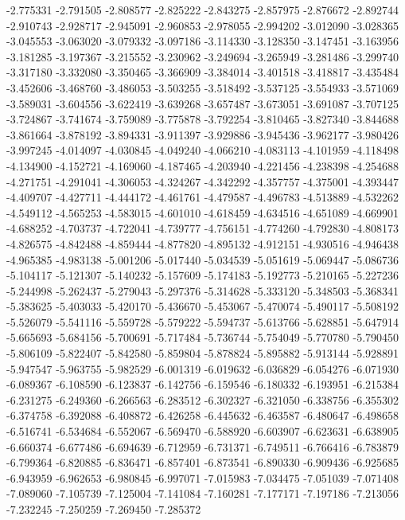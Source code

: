 -2.775331
-2.791505
-2.808577
-2.825222
-2.843275
-2.857975
-2.876672
-2.892744
-2.910743
-2.928717
-2.945091
-2.960853
-2.978055
-2.994202
-3.012090
-3.028365
-3.045553
-3.063020
-3.079332
-3.097186
-3.114330
-3.128350
-3.147451
-3.163956
-3.181285
-3.197367
-3.215552
-3.230962
-3.249694
-3.265949
-3.281486
-3.299740
-3.317180
-3.332080
-3.350465
-3.366909
-3.384014
-3.401518
-3.418817
-3.435484
-3.452606
-3.468760
-3.486053
-3.503255
-3.518492
-3.537125
-3.554933
-3.571069
-3.589031
-3.604556
-3.622419
-3.639268
-3.657487
-3.673051
-3.691087
-3.707125
-3.724867
-3.741674
-3.759089
-3.775878
-3.792254
-3.810465
-3.827340
-3.844688
-3.861664
-3.878192
-3.894331
-3.911397
-3.929886
-3.945436
-3.962177
-3.980426
-3.997245
-4.014097
-4.030845
-4.049240
-4.066210
-4.083113
-4.101959
-4.118498
-4.134900
-4.152721
-4.169060
-4.187465
-4.203940
-4.221456
-4.238398
-4.254688
-4.271751
-4.291041
-4.306053
-4.324267
-4.342292
-4.357757
-4.375001
-4.393447
-4.409707
-4.427711
-4.444172
-4.461761
-4.479587
-4.496783
-4.513889
-4.532262
-4.549112
-4.565253
-4.583015
-4.601010
-4.618459
-4.634516
-4.651089
-4.669901
-4.688252
-4.703737
-4.722041
-4.739777
-4.756151
-4.774260
-4.792830
-4.808173
-4.826575
-4.842488
-4.859444
-4.877820
-4.895132
-4.912151
-4.930516
-4.946438
-4.965385
-4.983138
-5.001206
-5.017440
-5.034539
-5.051619
-5.069447
-5.086736
-5.104117
-5.121307
-5.140232
-5.157609
-5.174183
-5.192773
-5.210165
-5.227236
-5.244998
-5.262437
-5.279043
-5.297376
-5.314628
-5.333120
-5.348503
-5.368341
-5.383625
-5.403033
-5.420170
-5.436670
-5.453067
-5.470074
-5.490117
-5.508192
-5.526079
-5.541116
-5.559728
-5.579222
-5.594737
-5.613766
-5.628851
-5.647914
-5.665693
-5.684156
-5.700691
-5.717484
-5.736744
-5.754049
-5.770780
-5.790450
-5.806109
-5.822407
-5.842580
-5.859804
-5.878824
-5.895882
-5.913144
-5.928891
-5.947547
-5.963755
-5.982529
-6.001319
-6.019632
-6.036829
-6.054276
-6.071930
-6.089367
-6.108590
-6.123837
-6.142756
-6.159546
-6.180332
-6.193951
-6.215384
-6.231275
-6.249360
-6.266563
-6.283512
-6.302327
-6.321050
-6.338756
-6.355302
-6.374758
-6.392088
-6.408872
-6.426258
-6.445632
-6.463587
-6.480647
-6.498658
-6.516741
-6.534684
-6.552067
-6.569470
-6.588920
-6.603907
-6.623631
-6.638905
-6.660374
-6.677486
-6.694639
-6.712959
-6.731371
-6.749511
-6.766416
-6.783879
-6.799364
-6.820885
-6.836471
-6.857401
-6.873541
-6.890330
-6.909436
-6.925685
-6.943959
-6.962653
-6.980845
-6.997071
-7.015983
-7.034475
-7.051039
-7.071408
-7.089060
-7.105739
-7.125004
-7.141084
-7.160281
-7.177171
-7.197186
-7.213056
-7.232245
-7.250259
-7.269450
-7.285372
